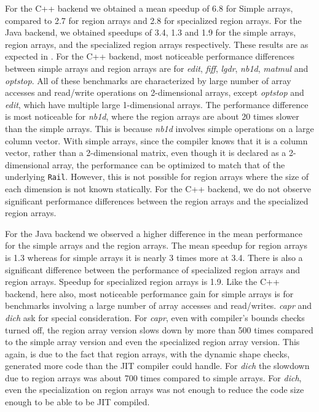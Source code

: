 For the C++ backend we obtained a mean speedup of 6.8 for Simple arrays,
compared to 2.7 for region arrays and 2.8 for specialized region arrays. For
the Java backend, we obtained speedups of 3.4, 1.3 and 1.9 for the simple
arrays, region arrays, and the specialized region arrays respectively. These
results are as expected in . For the C++ backend,
most noticeable performance differences between simple arrays and region arrays
are for \emph{edit}, \emph{fiff}, \emph{lgdr}, \emph{nb1d}, \emph{matmul} and
\emph{optstop}. All of these benchmarks are characterized by large number of
array accesses and read/write operations on 2-dimensional arrays, except
\emph{optstop} and \emph{edit}, which have multiple large 1-dimensional arrays.
The performance difference is most noticeable for \emph{nb1d}, where the region
arrays are about 20 times slower than the simple arrays. This is because
\emph{nb1d} involves simple operations on a large column vector. With simple
arrays, since the compiler knows that it is a column vector, rather than a
2-dimensional matrix, even though it is declared as a 2-dimensional array, the
performance can be optimized to match that of the underlying \texttt{Rail}.
However, this is not possible for region arrays where the size of each
dimension is not known statically. For the C++ backend, we do not observe
significant performance differences between the region arrays and the
specialized region arrays.

For the Java backend we observed a higher difference in the mean performance
for the simple arrays and the region arrays. The mean speedup for region arrays
is 1.3 whereas for simple arrays it is nearly 3 times more at 3.4. There is
also a significant difference between the performance of specialized region
arrays and region arrays. Speedup for specialized region arrays is 1.9. Like
the C++ backend, here also, most noticeable performance gain for simple arrays
is for benchmarks involving a large number of array accesses and read/writes.
\emph{capr} and \emph{dich} ask for special consideration. For \emph{capr},
even with \xten compiler's bounds checks turned off, the region array version
slows down by more than 500 times compared to the simple array version and even
the specialized region array version. This again, is due to the fact that
region arrays, with the dynamic shape checks, generated more code than the JIT
compiler could handle. For \emph{dich} the slowdown due to region arrays was
about 700 times compared to simple arrays. For \emph{dich}, even the
specialization on region arrays was not enough to reduce the code size enough
to be able to be JIT compiled. 

